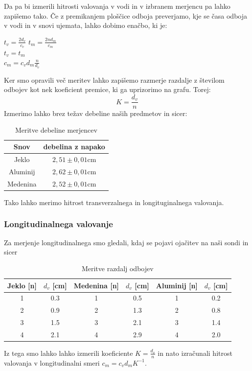 \documentclass[11pt, a4paper]{article}
\theoremstyle{definition}
\theoremstyle{example}
\theoremstyle{izrek}
\begin{document}
Da pa bi izmerili hitrosti valovanja v vodi in v izbranem merjencu pa lahko zapišemo tako.
Če z premikanjem ploščice odboja preverjamo, kje se časa odboja v vodi in v snovi ujemata, lahko dobimo enačbo, ki je: 
\begin{center}
$t_{v}=\frac{2d_{v}}{c_v}$ \quad
\medskip
$t_{m}=\frac{2nd_{m} }{c_m}$ \\
\medskip
$t_{v}=t_{m} $ \\
\medskip
$c_{m}= c_{v} d_{m} \frac{n}{d_{v}}$
\end{center}
Ker smo opravili več meritev lahko zapišemo razmerje razdalje z številom odbojev kot nek koeficient premice, ki ga uprizorimo na grafu. Torej: 
$$ K= \frac{d_v}{n}$$
Izmerimo lahko brez težav debeline naših predmetov in sicer: 
\begin{table}[ht]
	\centering
	\begin{tabular}{|c|c|}
	\hline 
	Snov & debelina z napako \\
	\hline 
	\hline 
	Jeklo &$2,51 \pm 0,01 \text{cm}$\\
	\hline 
	Aluminij &$2,62 \pm 0,01 \text{cm} $\\
	\hline 
	Medenina& $2,52 \pm 0,01\text{cm}$\\
	\hline 
		\end{tabular}
		\caption{Meritve debeline merjencev}
		\label{tab:FirstTable}
\end{table}
Tako lahko merimo hitrost transverzalnega in longituginalnega valovanja.
\subsubsection{Longitudinalnega valovanje}
Za merjenje longitudinalnega smo gledali, kdaj se pojavi ojačitev na naši sondi in sicer
\begin{table}[ht]
	\centering
	\begin{tabular}{|c|c|c|c|c|c|}
	\hline 
	Jeklo [n] & $d_v$ [cm] & Medenina [n] & $d_v$ [cm]& Aluminij [n] & $d_v$ [cm] \\ [1ex] 
	\hline 
	\hline 
	1 &	0.3 & 1 &  0.5 &1& 0.2\\
	\hline 
	2 & 0.9 & 2 & 1.3 &2& 0.8\\
	\hline 
	3 & 1.5 & 3 & 2.1 &3& 1.4\\
	\hline 
	4 & 2.1 & 4& 2.9 &4& 2.0\\
	\hline
		\end{tabular}
		\caption{Meritve razdalj odbojev}
		\label{tab:FirstTable}
\end{table}
Iz tega smo lahko lahko izmerili koeficiente $ K= \frac{d_v}{n}$ in nato izračunali hitrost valovanja v longitudinalni smeri $c_{m}= c_{v} d_{m} K^{-1}$.
\end{document}
